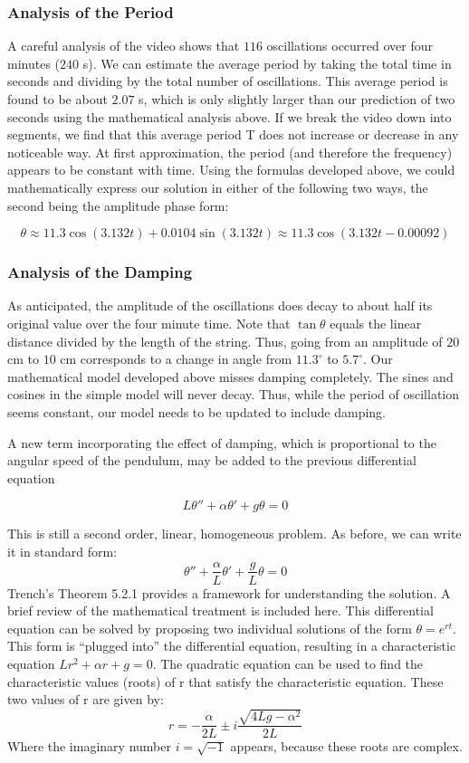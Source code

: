 \documentclass{ximera}
\begin{document}

\subsubsection*{Analysis of the Period}

A careful analysis of the video shows that $116$ oscillations occurred over four minutes ($240$ s).  We can estimate the average period by taking the total time in seconds and dividing by the total number of oscillations.  This average period is found to be about $2.07$ s, which is only slightly larger than our prediction of two seconds using the mathematical analysis above.  If we break the video down into segments, we find that this average period T does not increase or decrease in any noticeable way.  At first approximation, the period (and therefore the frequency) appears to be constant with time.  Using the formulas developed above, we could mathematically express our solution in either of the following two ways, the second being the amplitude phase form:

$$\theta\approx 11.3\cos (3.132t)+0.0104\sin (3.132t)\approx 11.3\cos(3.132t-0.00092)$$

\subsubsection*{Analysis of the Damping}

As anticipated, the amplitude of the oscillations does decay to about half its original value over the four minute time.  Note that $\tan\theta$ equals the linear distance divided by the length of the string.  Thus, going from an amplitude of $20$ cm to $10$ cm corresponds to a change in angle from $11.3^\circ$ to $5.7^\circ$.  Our mathematical model developed above misses damping completely.  The sines and cosines in the simple model will never decay.  Thus, while the period of oscillation seems constant, our model needs to be updated to include damping.

A new term incorporating the effect of damping, which is proportional to the angular speed of the pendulum, may be added to the previous differential equation

$$L\theta''+\alpha\theta'+g\theta=0$$

This is still a second order, linear, homogeneous problem.  As before, we can write it in standard form:
$$\theta''+\frac{\alpha}{L}\theta'+\frac{g}{L}\theta=0$$
Trench’s Theorem 5.2.1 provides a framework for understanding the solution.  A brief review of the mathematical treatment is included here.  This differential equation can be solved by proposing two individual solutions of the form $\theta=e^{rt}$.  This form is “plugged into” the differential equation, resulting in a characteristic equation $Lr^2+\alpha r+g=0$.  The quadratic equation can be used to find the characteristic values (roots) of r that satisfy the characteristic equation.  These two values of r are given by:
$$r=-\frac{\alpha}{2L}\pm i\frac{\sqrt{4Lg-\alpha^2}}{2L}$$
Where the imaginary number $i=\sqrt{-1}$ appears, because these roots are complex.
\end{document}
